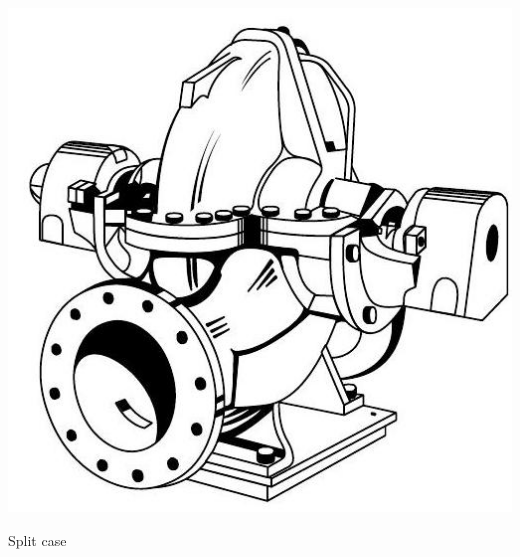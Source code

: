 \documentclass[10pt]{article}
\begin{document}
\includegraphics[max width=\textwidth]{CentrifugalSplitCase}

Split case
\end{document}
